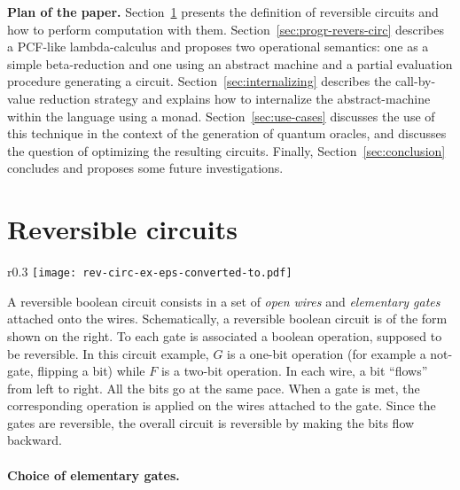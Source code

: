 \documentclass{article}
\theoremstyle{plain}
\theoremstyle{definition}
\newcommand{\define}[1]{{\em #1}}
\begin{document}
\smallskip
\noindent
{\bf Plan of the paper.}
Section~\ref{sec:reversible-circuits} presents the definition of
reversible circuits and how to perform computation with them.
Section~\ref{sec:progr-revers-circ} describes a PCF-like
lambda-calculus and proposes two operational semantics: one as a
simple beta-reduction and one using an abstract machine and a partial
evaluation procedure generating a
circuit. Section~\ref{sec:internalizing} describes the call-by-value
reduction strategy and explains how to internalize the
abstract-machine within the language using a
monad. Section~\ref{sec:use-cases} discusses the use of this technique
in the context of the generation of quantum oracles, and discusses the
question of optimizing the resulting circuits.  Finally,
Section~\ref{sec:conclusion} concludes and proposes some future
investigations.



\section{Reversible circuits}
\label{sec:reversible-circuits}

\begin{wrapfigure}{r}{0.3\textwidth}
\vspace{-10pt}
\texttt{[image: rev-circ-ex-eps-converted-to.pdf]}
\vspace{-10pt}
\end{wrapfigure}
A reversible boolean circuit consists in a set of \define{open wires}
and \define{elementary gates} attached onto the wires. Schematically,
a reversible boolean circuit is of the form shown on the right.
To each gate is associated a boolean operation, supposed to be
reversible. In this circuit example, $G$ is a one-bit operation (for
example a not-gate, flipping a bit) while $F$ is a two-bit
operation. In each wire, a bit ``flows'' from left to right. All the
bits go at the same pace. When a gate is met, the corresponding
operation is applied on the wires attached to the gate. Since the
gates are reversible, the overall circuit is reversible by making the
bits flow backward. 

\paragraph{\bf Choice of elementary gates.}
\end{document}
